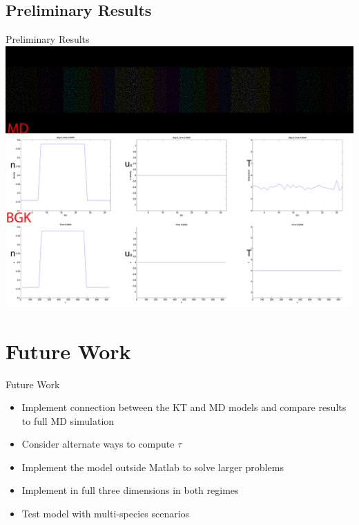 \documentclass{beamer}
\begin{document}
	\subsection{Preliminary Results}
	\begin{frame}{Preliminary Results}
		\includegraphics[width=1.0\textwidth]{BGK_MD_movie0000.png}
	\end{frame}
	
	\section{Future Work}
	\begin{frame}{Future Work}
		\begin{itemize}
			\item Implement connection between the KT and MD models and compare results to full MD simulation
			\vspace{0.5em}
			\item Consider alternate ways to compute $\tau$
			\vspace{0.5em}
			\item Implement the model outside Matlab to solve larger problems
			\vspace{0.5em}
			\item Implement in full three dimensions in both regimes
			\vspace{0.5em}
			\item Test model with multi-species scenarios
		\end{itemize}
	\end{frame}
\end{document}
